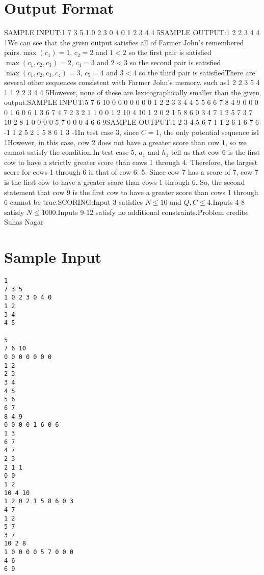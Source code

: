\documentclass[12pt]{article}
\begin{document}
\section*{Output Format}
SAMPLE INPUT:1
7 3 5
1 0 2 3 0 4 0
1 2
3 4
4 5SAMPLE OUTPUT:1 2 2 3 4 4 1We can see that the given output satisfies all of Farmer John's remembered
pairs.$\max(c_1) = 1$, $c_2 = 2$ and $1<2$ so the first pair is satisfied$\max(c_1,c_2,c_3) = 2$, $c_4 = 3$ and $2<3$ so the second pair is
satisfied$\max(c_1,c_2,c_3,c_4) = 3$, $c_5 = 4$ and $3<4$ so the third
pair is satisfiedThere are several other sequences consistent with Farmer John's memory, such as1 2 2 3 5 4 1
1 2 2 3 4 4 5However, none of these are lexicographically smaller than the given output.SAMPLE INPUT:5
7 6 10
0 0 0 0 0 0 0
1 2
2 3
3 4
4 5
5 6
6 7
8 4 9
0 0 0 0 1 6 0 6
1 3
6 7
4 7
2 3
2 1 1
0 0
1 2
10 4 10
1 2 0 2 1 5 8 6 0 3
4 7
1 2
5 7
3 7
10 2 8
1 0 0 0 0 5 7 0 0 0
4 6
6 9SAMPLE OUTPUT:1 2 3 4 5 6 7
1 1 2 6 1 6 7 6
-1
1 2 5 2 1 5 8 6 1 3
-1In test case 3, since $C=1$, the only potential sequence is1 1However, in this case, cow 2 does not have a greater score than cow 1, so we
cannot satisfy the condition.In test case 5, $a_1$ and $h_1$ tell us that cow 6 is the first cow to have a
strictly greater score than cows 1 through 4. Therefore, the largest score for
cows 1 through 6 is that of cow 6:  5. Since cow 7 has a score of 7, cow 7 is
the first cow to have a greater score than cows 1 through 6. So, the second
statement that cow 9 is the first cow to have a greater score than cows 1
through 6 cannot be true.SCORING:Input 3 satisfies $N \leq 10$ and $Q, C \leq 4$.Inputs 4-8 satisfy
$N \leq 1000$.Inputs 9-12 satisfy no additional constraints.Problem credits: Suhas Nagar

\section*{Sample Input}
\begin{verbatim}
1
7 3 5
1 0 2 3 0 4 0
1 2
3 4
4 5

5
7 6 10
0 0 0 0 0 0 0
1 2
2 3
3 4
4 5
5 6
6 7
8 4 9
0 0 0 0 1 6 0 6
1 3
6 7
4 7
2 3
2 1 1
0 0
1 2
10 4 10
1 2 0 2 1 5 8 6 0 3
4 7
1 2
5 7
3 7
10 2 8
1 0 0 0 0 5 7 0 0 0
4 6
6 9
\end{verbatim}
\end{document}
